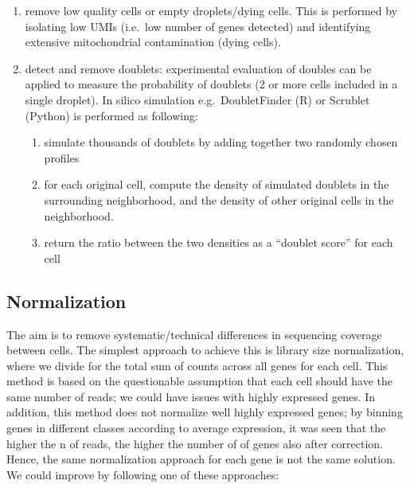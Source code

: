 \begin{enumerate}
\def\labelenumi{\arabic{enumi}.}
\tightlist
\item
  remove low quality cells or empty droplets/dying cells. This is
  performed by isolating low UMIs (i.e.~low number of genes detected)
  and identifying extensive mitochondrial contamination (dying cells).
\item
  detect and remove doublets: experimental evaluation of doubles can be
  applied to measure the probability of doublets (2 or more cells
  included in a single droplet). In silico simulation e.g.~DoubletFinder
  (R) or Scrublet (Python) is performed as following:

  \begin{enumerate}
  \def\labelenumii{\arabic{enumii}.}
  \tightlist
  \item
    simulate thousands of doublets by adding together two randomly
    chosen profiles
  \item
    for each original cell, compute the density of simulated doublets in
    the surrounding neighborhood, and the density of other original
    cells in the neighborhood.
  \item
    return the ratio between the two densities as a ``doublet score''
    for each cell
  \end{enumerate}
\end{enumerate}

\hypertarget{normalization}{%
\subsection{Normalization}\label{normalization}}

The aim is to remove systematic/technical differences in sequencing
coverage between cells. The simplest approach to achieve this is library
size normalization, where we divide for the total sum of counts across
all genes for each cell. This method is based on the questionable
assumption that each cell should have the same number of reads; we could
have issues with highly expressed genes. In addition, this method does
not normalize well highly expressed genes; by binning genes in different
classes according to average expression, it was seen that the higher the
n of reads, the higher the number of of genes also after correction.
Hence, the same normalization approach for each gene is not the same
solution. We could improve by following one of these approaches:

